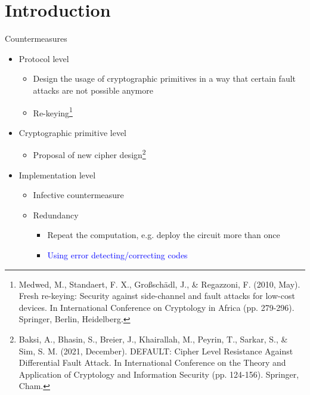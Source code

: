 \section{Introduction}
\begin{frame}{\VideoName}
    \tableofcontents[currentsection]
\end{frame}

\begin{frame}{Countermeasures}
    \begin{itemize}
        \item Protocol level
        \begin{itemize}
            \item Design the usage of cryptographic primitives in a way that certain fault attacks are not possible anymore
            \item Re-keying\footnote{Medwed, M., Standaert, F. X., Großschädl, J., \& Regazzoni, F. (2010, May). Fresh re-keying: Security against side-channel and fault attacks for low-cost devices. In International Conference on Cryptology in Africa (pp. 279-296). Springer, Berlin, Heidelberg.}
        \end{itemize}
        \item Cryptographic primitive level
        \begin{itemize}
            \item Proposal of new cipher design\footnote{Baksi, A., Bhasin, S., Breier, J., Khairallah, M., Peyrin, T., Sarkar, S., \& Sim, S. M. (2021, December). DEFAULT: Cipher Level Resistance Against Differential Fault Attack. In International Conference on the Theory and Application of Cryptology and Information Security (pp. 124-156). Springer, Cham.}
        \end{itemize}
        \item Implementation level
        \begin{itemize}
            \item Infective countermeasure
            \item Redundancy
            \begin{itemize}
                \item Repeat the computation, e.g. deploy the circuit more than once
                \item \textcolor{blue}{Using error detecting/correcting codes}
            \end{itemize}
        \end{itemize}
            \end{itemize}
\end{frame}

